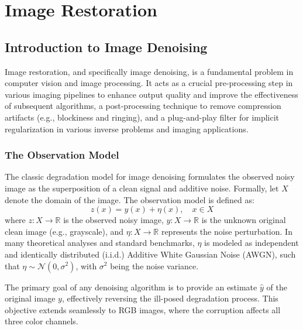 \chapter{Image Restoration}
\label{ch:image_restoration}

\section{Introduction to Image Denoising}
Image restoration, and specifically image denoising, is a fundamental problem in computer vision and image processing. It acts as a crucial pre-processing step in various imaging pipelines to enhance output quality and improve the effectiveness of subsequent algorithms, a post-processing technique to remove compression artifacts (e.g., blockiness and ringing), and a plug-and-play filter for implicit regularization in various inverse problems and imaging applications.

\subsection{The Observation Model}
The classic degradation model for image denoising formulates the observed noisy image as the superposition of a clean signal and additive noise. Formally, let $X$ denote the domain of the image. The observation model is defined as:
\begin{equation}
    z(x) = y(x) + \eta(x), \quad x \in X
\end{equation}
where $z: X \to \mathbb{R}$ is the observed noisy image, $y: X \to \mathbb{R}$ is the unknown original clean image (e.g., grayscale), and $\eta: X \to \mathbb{R}$ represents the noise perturbation. In many theoretical analyses and standard benchmarks, $\eta$ is modeled as independent and identically distributed (i.i.d.) Additive White Gaussian Noise (AWGN), such that $\eta \sim \mathcal{N}(0, \sigma^2)$, with $\sigma^2$ being the noise variance. 

The primary goal of any denoising algorithm is to provide an estimate $\hat{y}$ of the original image $y$, effectively reversing the ill-posed degradation process. This objective extends seamlessly to RGB images, where the corruption affects all three color channels. 

